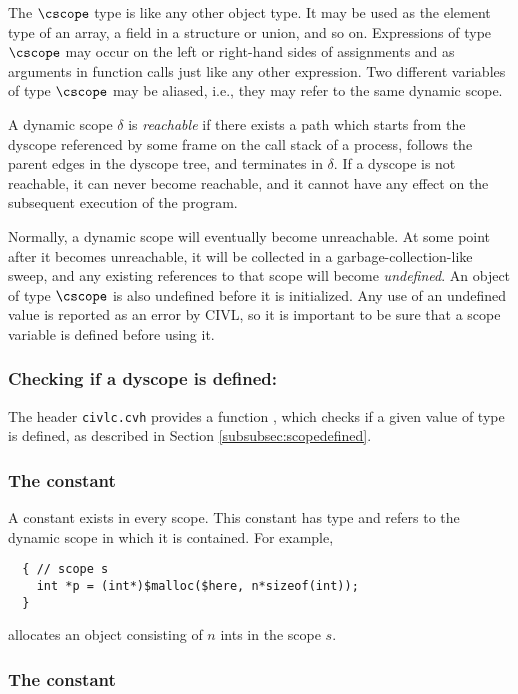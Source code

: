 The $\cscope$ type is like any other object type.  It may be used as
the element type of an array, a field in a structure or union, and so
on.  Expressions of type $\cscope$ may occur on the left or right-hand
sides of assignments and as arguments in function calls just like any
other expression.  Two different variables of type $\cscope$ may be
aliased, i.e., they may refer to the same dynamic scope.

A dynamic scope $\delta$ is \emph{reachable} if there exists a path
which starts from the dyscope referenced by some frame on the call
stack of a process, follows the parent edges in the dyscope tree, and
terminates in $\delta$.  If a dyscope is not reachable, it can never
become reachable, and it cannot have any effect on the subsequent
execution of the program.

Normally, a dynamic scope will eventually become unreachable.  At some
point after it becomes unreachable, it will be collected in a
garbage-collection-like sweep, and any existing references to that
scope will become \emph{undefined}.  An object of type $\cscope$ is
also undefined before it is initialized.  Any use of an undefined
value is reported as an error by CIVL, so it is important to be sure
that a scope variable is defined before using it.


\subsubsection{Checking if a dyscope is defined: \cscopedefined}

The header \texttt{civlc.cvh} provides a function \cscopedefined{}, which checks if a given 
value of \cscope{} type is defined, as described in Section \ref{subsubsec:scopedefined}.

\subsubsection{The constant \chere}

A constant \chere{} exists in every scope.  This constant has
type \cscope{} and refers to the dynamic scope in which it is
contained.  For example,
\begin{verbatim}
  { // scope s
    int *p = (int*)$malloc($here, n*sizeof(int));
  }
\end{verbatim}
allocates an object consisting of $n$ ints in the scope $s$.

\subsubsection{The constant \cscoperoot{}}

